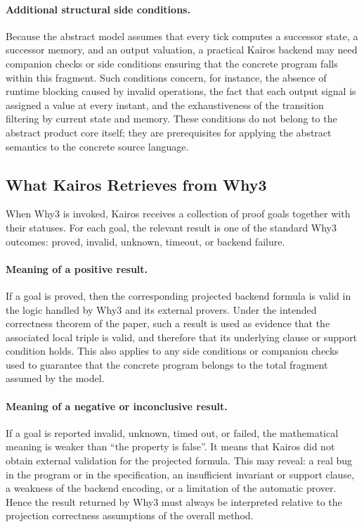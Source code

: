 \documentclass[11pt,a4paper]{article}
\begin{document}
\paragraph{Additional structural side conditions.}
Because the abstract model assumes that every tick computes a successor state,
a successor memory, and an output valuation, a practical Kairos backend may
need companion checks or side conditions ensuring that the concrete program
falls within this fragment. Such conditions concern, for instance, the absence
of runtime blocking caused by invalid operations, the fact that each output
signal is assigned a value at every instant, and the exhaustiveness of the
transition filtering by current state and memory. These conditions do not
belong to the abstract product core itself; they are prerequisites for applying
the abstract semantics to the concrete source language.

\subsection{What Kairos Retrieves from Why3}

When Why3 is invoked, Kairos receives a collection of proof goals together with
their statuses. For each goal, the relevant result is one of the standard Why3
outcomes: proved, invalid, unknown, timeout, or backend failure.

\paragraph{Meaning of a positive result.}
If a goal is proved, then the corresponding projected backend formula is valid
in the logic handled by Why3 and its external provers. Under the intended
correctness theorem of the paper, such a result is used as evidence that the
associated local triple is valid, and therefore that its underlying clause or
support condition holds. This also applies to
any side conditions or companion checks used to guarantee that the concrete
program belongs to the total fragment assumed by the model.

\paragraph{Meaning of a negative or inconclusive result.}
If a goal is reported invalid, unknown, timed out, or failed, the mathematical
meaning is weaker than ``the property is false''. It means that Kairos did not
obtain external validation for the projected formula. This may reveal:
a real bug in the program or in the specification, an insufficient invariant
or support clause, a weakness of the backend encoding, or a limitation of the
automatic prover.
Hence the result returned by Why3 must always be interpreted relative to the
projection correctness assumptions of the overall method.
\end{document}
